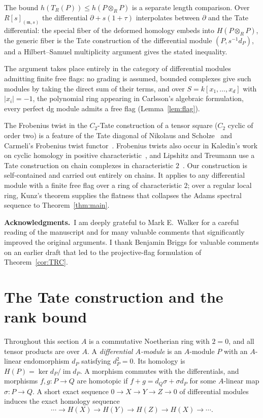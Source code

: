 \documentclass[11pt,reqno]{amsart}
\theoremstyle{plain}
\theoremstyle{definition}
\DeclareMathOperator{\im}{im}
\newcommand{\Tate}{T}                 %
\newcommand{\htot}{h}
\begin{document}
The bound $\htot(\Tate_R(P))\le\htot(P\otimes_R P)$ is a separate length comparison.  Over
$R[s]_{(\mathfrak m,s)}$ the differential $\partial+s(1+\tau)$ interpolates between $\partial$ and
the Tate differential: the special fiber of the deformed homology embeds into $H(P\otimes_RP)$, the
generic fiber is the Tate construction of the differential module $(P,s^{-1}d_P)$, and a
Hilbert--Samuel multiplicity argument gives the stated inequality.

The argument takes place entirely in the category of differential modules admitting finite free
flags: no grading is assumed, bounded complexes give such modules by taking the direct sum of their
terms, and over
$S=k[x_1,\dots,x_d]$ with $|x_i|=-1$, the polynomial ring appearing in Carlsson's algebraic
formulation, every perfect dg module admits a free flag (Lemma~\ref{lem:flag}).

The Frobenius twist in the $C_2$-Tate construction of a tensor square ($C_2$ cyclic of order two) is
a feature of the Tate diagonal of Nikolaus and Scholze~\cite{NS} and Carmeli's Frobenius twist
functor~\cite[Definition~2.9]{Carmeli}.  Frobenius twists also occur in Kaledin's work on cyclic
homology in positive characteristic~\cite{Kaledin}, and Lipshitz and Treumann use a Tate
construction on chain complexes in characteristic $2$~\cite{LipshitzTreumann}.
Our construction is self-contained and carried out entirely on chains.  It applies to any differential module
with a finite free flag over a ring of characteristic $2$; over a regular local ring, Kunz's theorem
supplies the flatness that collapses the Adams spectral sequence to Theorem~\ref{thm:main}.

\medskip\noindent\textbf{Acknowledgments.}\ I am deeply grateful to Mark E.~Walker for a careful reading
of the manuscript and for many valuable comments that significantly improved the original arguments.
I thank Benjamin Briggs for valuable comments on an earlier draft that led to the projective-flag
formulation of Theorem~\ref{cor:TRC}.

\section{The Tate construction and the rank bound}\label{sec:deduce}

Throughout this section $A$ is a commutative Noetherian ring with $2=0$, and all tensor products are
over $A$.  A \emph{differential $A$-module} is an $A$-module $P$ with an $A$-linear endomorphism
$d_P$ satisfying $d_P^{2}=0$.  Its homology is $H(P)=\ker d_P/\im d_P$.  A morphism commutes with
the differentials, and morphisms $f,g\colon P\to Q$ are homotopic if
$f+g=d_Q\sigma+\sigma d_P$ for some $A$-linear map $\sigma\colon P\to Q$.  A short exact sequence
$0\to X\to Y\to Z\to0$ of differential modules induces the exact homology sequence
\[
\cdots\longrightarrow H(X)\longrightarrow H(Y)\longrightarrow H(Z)\longrightarrow
H(X)\longrightarrow\cdots.
\]
\end{document}
